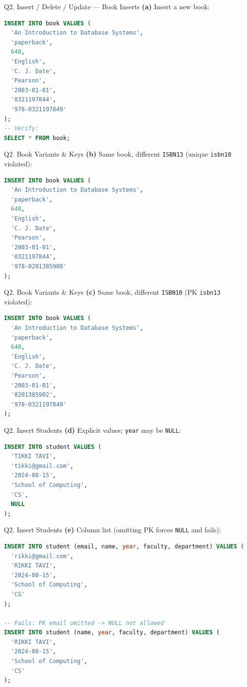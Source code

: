 \documentclass{beamer}
\begin{document}
\begin{frame}[fragile]{Q2. Insert / Delete / Update — Book Inserts}
\textbf{(a)} Insert a new book:
\begin{lstlisting}[language=SQL]
INSERT INTO book VALUES (
  'An Introduction to Database Systems',
  'paperback',
  640,
  'English',
  'C. J. Date',
  'Pearson',
  '2003-01-01',
  '0321197844',
  '978-0321197849'
);
-- Verify:
SELECT * FROM book;
\end{lstlisting}
\end{frame}

\begin{frame}[fragile]{Q2. Book Variants \& Keys}
\textbf{(b)} Same book, different \texttt{ISBN13} (unique \texttt{isbn10} violated):
\begin{lstlisting}[language=SQL]
INSERT INTO book VALUES (
  'An Introduction to Database Systems',
  'paperback',
  640,
  'English',
  'C. J. Date',
  'Pearson',
  '2003-01-01',
  '0321197844',
  '978-0201385908'
);
\end{lstlisting}
\end{frame}

\begin{frame}[fragile]{Q2. Book Variants \& Keys}
\textbf{(c)} Same book, different \texttt{ISBN10} (PK \texttt{isbn13} violated):
\begin{lstlisting}[language=SQL]
INSERT INTO book VALUES (
  'An Introduction to Database Systems',
  'paperback',
  640,
  'English',
  'C. J. Date',
  'Pearson',
  '2003-01-01',
  '0201385902',
  '978-0321197849'
);
\end{lstlisting}
\end{frame}

\begin{frame}[fragile]{Q2. Insert Students}
\textbf{(d)} Explicit values; \texttt{year} may be \texttt{NULL}:
\begin{lstlisting}[language=SQL]
INSERT INTO student VALUES (
  'TIKKI TAVI',
  'tikki@gmail.com',
  '2024-08-15',
  'School of Computing',
  'CS',
  NULL
);
\end{lstlisting}
\end{frame}

\begin{frame}[fragile]{Q2. Insert Students}
\textbf{(e)} Column list (omitting PK forces \texttt{NULL} and fails):
\begin{lstlisting}[language=SQL]
INSERT INTO student (email, name, year, faculty, department) VALUES (
  'rikki@gmail.com',
  'RIKKI TAVI',
  '2024-08-15',
  'School of Computing',
  'CS'
);

-- Fails: PK email omitted -> NULL not allowed
INSERT INTO student (name, year, faculty, department) VALUES (
  'RIKKI TAVI',
  '2024-08-15',
  'School of Computing',
  'CS'
);
\end{lstlisting}
\end{frame}
\end{document}
